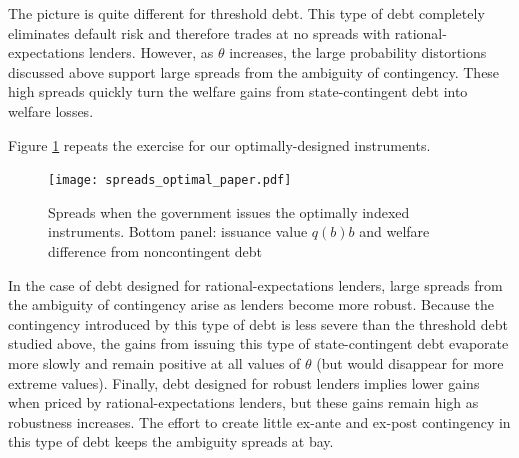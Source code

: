 The picture is quite different for threshold debt. This type of debt completely eliminates default risk and therefore trades at no spreads with rational-expectations lenders. However, as $\theta$ increases, the large probability distortions discussed above support large spreads from the ambiguity of contingency. These high spreads quickly turn the welfare gains from state-contingent debt into welfare losses.

Figure \ref{Figure_spreads_optimal} repeats the exercise for our optimally-designed instruments.
\begin{figure}[!htbp]\centering
    \texttt{[image: spreads\_optimal\_paper.pdf]}
\caption{Spreads when the government issues the optimally indexed instruments. Bottom panel: issuance value $q(b)b$ and welfare difference from noncontingent debt}
\label{Figure_spreads_optimal}
\end{figure}
In the case of debt designed for rational-expectations lenders, large spreads from the ambiguity of contingency arise as lenders become more robust. Because the contingency introduced by this type of debt is less severe than the threshold debt studied above, the gains from issuing this type of state-contingent debt evaporate more slowly and remain positive at all values of $\theta$ (but would disappear for more extreme values). Finally, debt designed for robust lenders implies lower gains when priced by rational-expectations lenders, but these gains remain high as robustness increases. The effort to create little ex-ante and ex-post contingency in this type of debt keeps the ambiguity spreads at bay.

